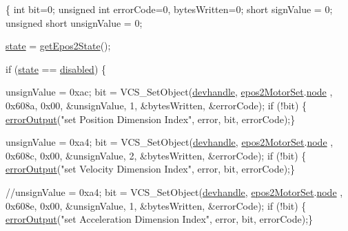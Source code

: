 \begin{DoxyCode}
\{
    \textcolor{keywordtype}{int} bit=0;
    \textcolor{keywordtype}{unsigned} \textcolor{keywordtype}{int} errorCode=0, bytesWritten=0;
    \textcolor{keywordtype}{short} signValue = 0;
    \textcolor{keywordtype}{unsigned} \textcolor{keywordtype}{short} unsignValue = 0;

    \hyperlink{classEpos2MotorController_a7194b8efd4f2fd5a4d64b10135c416e2}{state} = \hyperlink{classEpos2MotorController_ac6c31e0dc57485aa817431b22627fc70}{getEpos2State}();

    \textcolor{keywordflow}{if} (\hyperlink{classEpos2MotorController_a7194b8efd4f2fd5a4d64b10135c416e2}{state} == \hyperlink{classEpos2MotorController_ab5ec630dfbb90ad674e311187926060caf0eea74682d3d3f21bec6e5b376cf443}{disabled}) \{

        unsignValue = 0xac;
        bit = VCS\_SetObject(\hyperlink{classEpos2MotorController_a40594faab444bcba221ab9d55d1162cd}{devhandle}, \hyperlink{classEpos2MotorController_a0856f5fdd71ffa3b84a536afa085bfb1}{epos2MotorSet}.\hyperlink{structEpos2MotorController_1_1epos2Settings_ab8f18d3df17e8de9ed5250a3e53292c6}{node}
      , 0x608a, 0x00, &unsignValue, 1, &bytesWritten, &errorCode);
        \textcolor{keywordflow}{if} (!bit) \{ \hyperlink{classEpos2MotorController_a64d5e3e3858597c111e60ba8b382a63b}{errorOutput}(\textcolor{stringliteral}{"set Position Dimension Index"}, 
      error, bit, errorCode);\}

        unsignValue = 0xa4;
        bit = VCS\_SetObject(\hyperlink{classEpos2MotorController_a40594faab444bcba221ab9d55d1162cd}{devhandle}, \hyperlink{classEpos2MotorController_a0856f5fdd71ffa3b84a536afa085bfb1}{epos2MotorSet}.\hyperlink{structEpos2MotorController_1_1epos2Settings_ab8f18d3df17e8de9ed5250a3e53292c6}{node}
      , 0x608c, 0x00, &unsignValue, 2, &bytesWritten, &errorCode);
        \textcolor{keywordflow}{if} (!bit) \{ \hyperlink{classEpos2MotorController_a64d5e3e3858597c111e60ba8b382a63b}{errorOutput}(\textcolor{stringliteral}{"set Velocity Dimension Index"}, 
      error, bit, errorCode);\}

        \textcolor{comment}{//unsignValue = 0xa4;}
        bit = VCS\_SetObject(\hyperlink{classEpos2MotorController_a40594faab444bcba221ab9d55d1162cd}{devhandle}, \hyperlink{classEpos2MotorController_a0856f5fdd71ffa3b84a536afa085bfb1}{epos2MotorSet}.\hyperlink{structEpos2MotorController_1_1epos2Settings_ab8f18d3df17e8de9ed5250a3e53292c6}{node}
      , 0x608e, 0x00, &unsignValue, 1, &bytesWritten, &errorCode);
        \textcolor{keywordflow}{if} (!bit) \{ \hyperlink{classEpos2MotorController_a64d5e3e3858597c111e60ba8b382a63b}{errorOutput}(\textcolor{stringliteral}{"set Acceleration Dimension Index"}, 
      error, bit, errorCode);\}


\end{DoxyCode}
